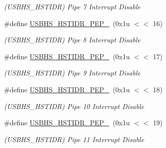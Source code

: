 \begin{DoxyCompactItemize}
\begin{DoxyCompactList}\small\item\em (U\+S\+B\+H\+S\+\_\+\+H\+S\+T\+I\+DR) Pipe 7 Interrupt Disable \end{DoxyCompactList}\item 
\mbox{\label{group__SAMS70__USBHS_ga9015330b05ecb493199baf99632b2f04}} 
\#define \mbox{\hyperlink{group__SAMS70__USBHS_ga9015330b05ecb493199baf99632b2f04}{U\+S\+B\+H\+S\+\_\+\+H\+S\+T\+I\+D\+R\+\_\+\+P\+E\+P\+\_}}~(0x1u $<$$<$ 16)
\begin{DoxyCompactList}\small\item\em (U\+S\+B\+H\+S\+\_\+\+H\+S\+T\+I\+DR) Pipe 8 Interrupt Disable \end{DoxyCompactList}\item 
\mbox{\label{group__SAMS70__USBHS_gafc3b8583cd91aae6cf5fdd82191033db}} 
\#define \mbox{\hyperlink{group__SAMS70__USBHS_gafc3b8583cd91aae6cf5fdd82191033db}{U\+S\+B\+H\+S\+\_\+\+H\+S\+T\+I\+D\+R\+\_\+\+P\+E\+P\+\_}}~(0x1u $<$$<$ 17)
\begin{DoxyCompactList}\small\item\em (U\+S\+B\+H\+S\+\_\+\+H\+S\+T\+I\+DR) Pipe 9 Interrupt Disable \end{DoxyCompactList}\item 
\mbox{\label{group__SAMS70__USBHS_ga7214fd8298b4300174a230afe5a352fb}} 
\#define \mbox{\hyperlink{group__SAMS70__USBHS_ga7214fd8298b4300174a230afe5a352fb}{U\+S\+B\+H\+S\+\_\+\+H\+S\+T\+I\+D\+R\+\_\+\+P\+E\+P\+\_}}~(0x1u $<$$<$ 18)
\begin{DoxyCompactList}\small\item\em (U\+S\+B\+H\+S\+\_\+\+H\+S\+T\+I\+DR) Pipe 10 Interrupt Disable \end{DoxyCompactList}\item 
\mbox{\label{group__SAMS70__USBHS_ga3abd77f8160b8f2c947e08480a3447ba}} 
\#define \mbox{\hyperlink{group__SAMS70__USBHS_ga3abd77f8160b8f2c947e08480a3447ba}{U\+S\+B\+H\+S\+\_\+\+H\+S\+T\+I\+D\+R\+\_\+\+P\+E\+P\+\_}}~(0x1u $<$$<$ 19)
\begin{DoxyCompactList}\small\item\em (U\+S\+B\+H\+S\+\_\+\+H\+S\+T\+I\+DR) Pipe 11 Interrupt Disable \end{DoxyCompactList}\item 

\end{DoxyCompactItemize}

